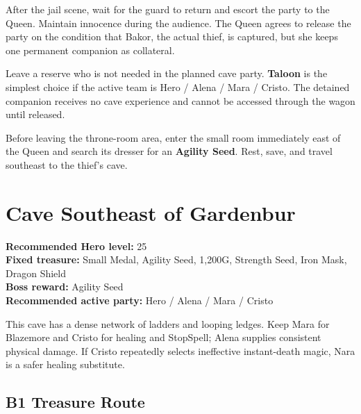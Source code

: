 \documentclass[
  american,
  10pt,
  letterpaper,
  oneside,
  open=any]{scrreprt}
\begin{document}
After the jail scene, wait for the guard to return and escort the party
to the Queen. Maintain innocence during the audience. The Queen agrees
to release the party on the condition that Bakor, the actual thief, is
captured, but she keeps one permanent companion as collateral.

Leave a reserve who is not needed in the planned cave party.
\textbf{Taloon} is the simplest choice if the active team is Hero /
Alena / Mara / Cristo. The detained companion receives no cave
experience and cannot be accessed through the wagon until released.

Before leaving the throne-room area, enter the small room immediately
east of the Queen and search its dresser for an \textbf{Agility Seed}.
Rest, save, and travel southeast to the thief's cave.

\section{Cave Southeast of Gardenbur}\label{cave-southeast-of-gardenbur}

\textbf{Recommended Hero level:} 25\\
\textbf{Fixed treasure:} Small Medal, Agility Seed, 1,200G, Strength
Seed, Iron Mask, Dragon Shield\\
\textbf{Boss reward:} Agility Seed\\
\textbf{Recommended active party:} Hero / Alena / Mara / Cristo

This cave has a dense network of ladders and looping ledges. Keep Mara
for Blazemore and Cristo for healing and StopSpell; Alena supplies
consistent physical damage. If Cristo repeatedly selects ineffective
instant-death magic, Nara is a safer healing substitute.

\subsection{B1 Treasure Route}\label{b1-treasure-route}
\end{document}

